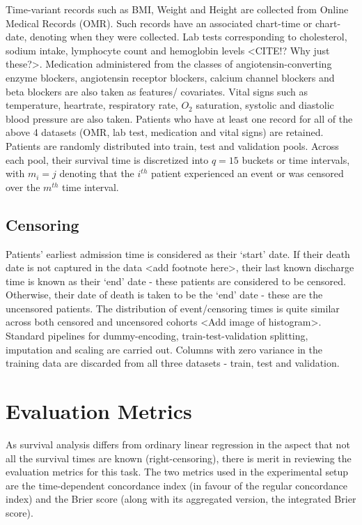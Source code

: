 \documentclass[%
 reprint,
 amsmath,amssymb,
 aps,
]{revtex4-2}
\begin{document}
Time-variant records such as BMI, Weight and Height are collected from Online Medical Records (OMR). Such records have an associated chart-time or chart-date, denoting when they were collected. Lab tests corresponding to cholesterol, sodium intake, lymphocyte count and hemoglobin levels <CITE!? Why just these?>. Medication administered from the classes of angiotensin-converting enzyme blockers, angiotensin receptor blockers, calcium channel blockers and beta blockers are also taken as features/ covariates. Vital signs such as temperature, heartrate, respiratory rate, $O_2$ saturation, systolic and diastolic blood pressure are also taken. Patients who have at least  one record for all of the above 4 datasets (OMR, lab test, medication and vital signs) are retained.\\

Patients are randomly distributed into train, test and validation pools. Across each pool, their survival time is discretized into $q=15$ buckets or time intervals, with $m_i=j$ denoting that the $i^{th}$ patient experienced an event or was censored over the $m^{th}$ time interval.

\subsection{\label{censoring}Censoring}
Patients' earliest admission time is considered as their `start' date. If their death date is not captured in the data <add footnote here>, their last known discharge time is known as their `end' date - these patients are considered to be censored. Otherwise, their date of death is taken to be the `end' date - these are the uncensored patients. The distribution of event/censoring times is quite similar across both censored and uncensored cohorts <Add image of histogram>. Standard pipelines for dummy-encoding, train-test-validation splitting, imputation and scaling are carried out. Columns with zero variance in the training data are discarded from all three datasets - train, test and validation.


\section{\label{metrics}Evaluation Metrics}
As survival analysis differs from ordinary linear regression in the aspect that not all the survival times are known (right-censoring), there is merit in reviewing the evaluation metrics for this task. The two metrics used in the experimental setup are the time-dependent concordance index (in favour of the regular concordance index) and the Brier score (along with its aggregated version, the integrated Brier score).
\end{document}
